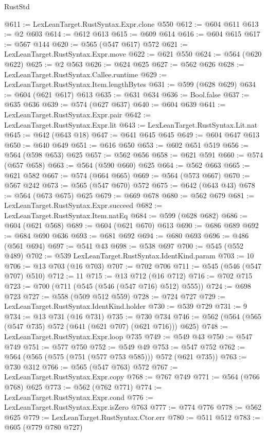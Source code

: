 \begin{lexlean}{RustStd}
\begin{coremodule}
@611 := LexLeanTarget.RustSyntax.Expr.clone @550
@612 := @604 @611
@613 := @2 @603
@614 := @612 @613
@615 := @609 @614
@616 := @604 @615
@617 := @567 @144
@620 := @565 (@547 @617) @572
@621 := LexLeanTarget.RustSyntax.Expr.move
@622 := @621 @550
@624 := @564 (@620 @622)
@625 := @2 @563
@626 := @624 @625
@627 := @562 @626
@628 := LexLeanTarget.RustSyntax.Callee.runtime
@629 := LexLeanTarget.RustSyntax.Item.lengthBytes
@631 := @599 (@628 @629)
@634 := @604 (@621 @617) @613
@635 := @631 @634
@636 := Bool.false
@637 := @635 @636
@639 := @574 (@627 @637)
@640 := @604 @639
@641 := LexLeanTarget.RustSyntax.Expr.pair
@642 := LexLeanTarget.RustSyntax.Expr.lit
@643 := LexLeanTarget.RustSyntax.Lit.nat
@645 := @642 (@643 @18)
@647 := @641 @645 @645
@649 := @604 @647 @613
@650 := @640 @649
@651 := @616 @650
@653 := @602 @651 @519
@656 := @564 (@598 @653) @625
@657 := @562 @656
@658 := @621 @591
@660 := @574 (@657 @658)
@663 := @564 (@590 @660) @625
@664 := @562 @663
@665 := @621 @582
@667 := @574 (@664 @665)
@669 := @564 (@573 @667)
@670 := @567 @242
@673 := @565 (@547 @670) @572
@675 := @642 (@643 @43)
@678 := @564 (@673 @675) @625
@679 := @669 @678
@680 := @562 @679
@681 := LexLeanTarget.RustSyntax.Expr.succeed
@682 := LexLeanTarget.RustSyntax.Item.natEq
@684 := @599 (@628 @682)
@686 := @604 (@621 @568)
@689 := @604 (@621 @670) @613
@690 := @686 @689
@692 := @684 @690 @636
@693 := @681 @692
@694 := @680 @693
@696 := @486 (@561 @694)
@697 := @541 @43
@698 := @538 @697
@700 := @545 (@552 @489)
@702 := @539 LexLeanTarget.RustSyntax.IdentKind.param
@703 := 10
@706 := @13 @703 (@16 @703)
@707 := @702 @706
@711 := @545 (@546 (@547 @707) @510)
@712 := 11
@715 := @13 @712 (@16 @712)
@716 := @702 @715
@723 := @700 (@711 (@545 (@546 (@547 @716) @512) @555))
@724 := @698 @723
@727 := @558 (@509 @512 @559)
@728 := @724 @727
@729 := LexLeanTarget.RustSyntax.IdentKind.holder
@730 := @539 @729
@731 := 9
@734 := @13 @731 (@16 @731)
@735 := @730 @734
@746 := @562 (@564 (@565 (@547 @735) @572 (@641 (@621 @707) (@621 @716))) @625)
@748 := LexLeanTarget.RustSyntax.Expr.loop @735
@749 := @549 @43
@750 := @547 @749
@751 := @577 @750
@752 := @549 @49
@753 := @547 @752
@762 := @564 (@565 (@575 (@751 (@577 @753 @585))) @572 (@621 @735))
@763 := @730 @312
@766 := @565 (@547 @763) @572
@767 := LexLeanTarget.RustSyntax.Expr.copy
@768 := @767 @749
@771 := @564 (@766 @768) @625
@773 := @562 (@762 @771)
@774 := LexLeanTarget.RustSyntax.Expr.cond
@776 := LexLeanTarget.RustSyntax.Expr.isZero @763
@777 := @774 @776
@778 := @562 @625
@779 := LexLeanTarget.RustSyntax.Ctor.err
@780 := @511 @512
@783 := @605 (@779 @780 @727)

\end{coremodule}
\end{lexlean}
